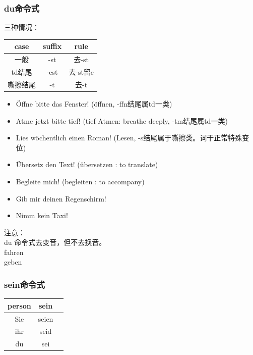 \subsubsection{du命令式}
三种情况：
\begin{center}
    \begin{tabular} {|c|c|c|}
        \hline
        \rowcolor{gray}
        case & suffix & rule   \\
        \hline
        一般   & -st    & 去-st   \\
        \hline
        td结尾 & -est   & 去-st留e \\
        \hline
        嘶擦结尾 & -t     & 去-t    \\
        \hline
    \end{tabular}
\end{center}
\begin{itemize}
    \item Öffne bitte das Fenster! (öffnen, -ffn结尾属td一类)
    \item Atme jetzt bitte tief! (tief Atmen: breathe deeply, -tm结尾属td一类)
    \item Lies wöchentlich einen Roman! (Lesen, -s结尾属于嘶擦类。词干正常特殊变位)
    \item Übersetz den Text! (übersetzen \cir[color=gray]: to translate)
    \item Begleite mich! (begleiten \cir[color=gray]: to accompany)
    \item Gib mir deinen Regenschirm!
    \item Nimm kein Taxi!
\end{itemize}
注意：\\
du 命令式去变音，但不去换音。\\
fahren   \\
geben  

\subsubsection{sein命令式}
\begin{center}
    \begin{tabular} {|c|c|c|}
        \hline
        \rowcolor{gray}
        person & sein  \\
        \hline
        Sie    & seien \\
        \hline
        ihr    & seid  \\
        \hline
        du     & sei   \\
        \hline
    \end{tabular}
\end{center}

